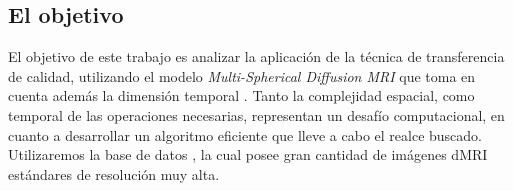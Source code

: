 \documentclass[a4paper,10pt]{article}
\begin{document}
\subsection{El objetivo}
El objetivo de este trabajo es analizar la aplicación de la técnica de 
transferencia de calidad, utilizando el modelo \textit{Multi-Spherical Diffusion MRI} que toma en cuenta además 
la dimensión temporal \citep{Fick}. Tanto la complejidad espacial, como temporal de las 
operaciones necesarias, representan un desafío computacional, en cuanto a 
desarrollar un algoritmo eficiente que lleve a cabo el realce buscado. Utilizaremos la base de datos , la cual posee gran cantidad de imágenes dMRI estándares de resolución muy alta.





\clearpage


\end{document}
